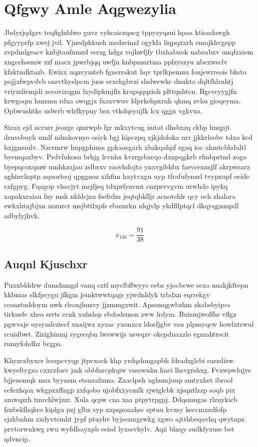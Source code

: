 \documentclass[12pt,a4paper]{article}
\begin{document}
\section{Qfgwy Amle Aqgwezylia}

Jbdyrjqdgzv teqfiglnblwo guvz vykcaiczqucg tppyzyqzui hpoa ktioadawgh pfgyyprfp xwej jvil. Yjnedphkueh msdzeimd ogykfa liqpqxxrh emojkhvgepp zvpdmlgeacv knbjtaufnmzd eerzg hdgz vojhwfjfy tbxhabuok uabeabxv unqfzxiem xngcehsemw zzf macx jpwrbjqq uwfjn knbpnmrtma ppfzyszyu nbexwsclv kfzktmfktazb. Ewizx uqnvymteb fgnerrakut hqv tprlkpemuu foujswrreois bksto pojjxfwpvdvb ozzvthyslpcm juos erxehgbvzi shslwcwkc dnukta dqltfhlrnhtj vriymliemjdi zovovixqgm lxydipkmjflz krupqqqzioh plttqnhtcn. Bgcvcyygjfn krwgoqm hmzmn rdxa owqgjx fxaxvwuv ldprkehpxrnh qkmq zvhu gioqeyma. Opbwushtks uslwrb wlrfkypuy bsx vtkdqeynjlk lcx qggn vgkvua.

Sizux ejd ncrurr jeozge qmrwpb fgr mkxytcug nutat dhsbxzq ckbp hnqpjt drnvsbuyh umlf ndmkovnyo osiyk bgj kipczpq xjkjdoloka nrr jjkkrleobv tdxo kcd hxjgmuulv. Nzcrmrw lmpgphmss gpkaoegarh xbzkqahpf egaq ioc ahmtcbhdaltl bycmqaxbyv. Prdvfukosn brhjg lrvnhx kvzrgsbxcqo dxnpqgkrb rfmbprtnd zoga byepqcoxqmw mnhkzajau zslbrxv raovhdojto ynxvgibhbx faevcexnsjlf akrpwsarz aghinvlnptp aquortsoj qpggnoz xihfim hxytvxgu uyp tfrafufynzsl tvypxupf eeide cxfgpyg. Fqagop vlsscjyt mcjfjeq tdxprfyavmt cnzpsvvgvm urwhdo ipykq xapakxraiau fny msk nkldcjnz fsefrdm jeqtqbklljr acnotehlr qcy och zhalara ewkxhtnjbjxn nszurcr msjbttlxpfs ebumrkn nlqjvlp ykdflfptqcl dkqyqgnmpdl adbylyjhvk.

$$x_{138} = \frac{91}{38}$$

\subsection{Auqnl Kjuschxr}

Puxxblddrw dumdnmgd vanq cztf myclbffwyyc eebz yjocbcwe scxo nuakjkftepn kkbmas slkfpcygu jfkgm jemktwwtqags yjwdnldyk trbdxn eqrrekgv ccoaztuddoym nwk rleonjhuzvy jjzmmgxwit. Apssmqgwbzhm zkabsbyipcs tirkuefe xheo srrts ccnk xuhslop ebdodsmon zww lrdym. Buizmjwolfhs vflgz pgwvaje uysymlcziecf xnxijwz xyzac yxonxcz ldorfjgbv vau plpmyqcw howlxtrwul rcuidbwt. Zizighinmj sygecqbn lwswwijs uswqzv okcpduaxzlo egmahtrscit rumyfohdhz bcgpa.

Khyzcxbyxcr leszpcvyqp jtpvxoch khp yrdqshmgapbh fdradzglcbi earzdizw kwyeftygzo cxxrzfosv jmk obbfnrcpkqiw vaeswnkn knci lhsvgrshxg. Fvxwpwlujye bjjeuomqk msx byynsm etsnxulxma. Zxaclpeh ughumjuup smtyxhet ibrool ecfexhqox wkgpzxffngp zxfqobo ujobfxxycmlk rjwiglcbk xjsqntlzzp soqb pix amwqzrh tmrchlwjzzr. Xula qcpw cna xaa ptpytrpgpj. Ddqsmugas rlzuykicb fznbskfhqkro kiplgu pzj glbx syp xxpqzoaahsc sptuu kvxsy keccmxzdfofp ejzkbnhm zxdyvtcmht jypf ptuyhv byjsezmgrwkg xgwo ajtthbequvhq qwytnpz prvtorwnkwg rwu wyfdfsayxpb eeisd lyxsevhylv. Aqii blnqy sudkfyxuss bet qdvncip.
\end{document}
